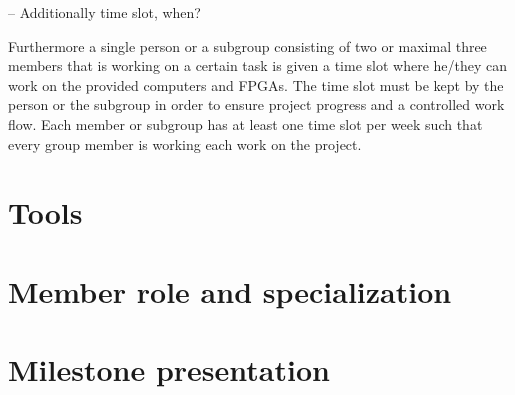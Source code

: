 -- Additionally time slot, when?

Furthermore a single person or a subgroup consisting of two or maximal three members that is working on a certain task is given a time slot where he/they can work on the provided computers and FPGAs.
The time slot must be kept by the person or the subgroup in order to ensure project progress and a controlled work flow.
Each member or subgroup has at least one time slot per week such that every group member is working each work on the project.

\section{Tools}

\section{Member role and specialization}

\section{Milestone presentation}